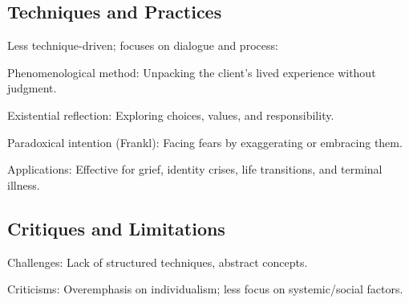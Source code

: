 \subsection{Techniques and Practices}
\begin{coloredlist}
    \item Less technique-driven; focuses on dialogue and process:
    \begin{coloredlist}
        \item Phenomenological method: Unpacking the client’s lived experience without judgment.
        \item Existential reflection: Exploring choices, values, and responsibility.
        \item Paradoxical intention (Frankl): Facing fears by exaggerating or embracing them.
    \end{coloredlist}
    \item Applications: Effective for grief, identity crises, life transitions, and terminal illness.
\end{coloredlist}

\subsection{Critiques and Limitations}
\begin{coloredlist}
    \item Challenges: Lack of structured techniques, abstract concepts.
    \item Criticisms: Overemphasis on individualism; less focus on systemic/social factors.
\end{coloredlist}
